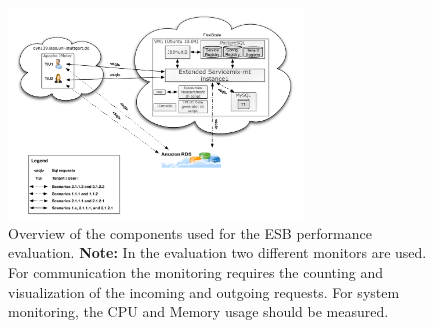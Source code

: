 \begin{figure}[htb]
	\centering
		\includegraphics[width=0.7\textwidth, trim=0.0cm 0.0cm 0.0cm 0.0cm, clip]{./gfx/evaluationoverview.pdf}
	\caption[Performance Evaluation Components Overview]{Overview of the components used for the \ac{ESB} performance evaluation. \textbf{Note:} In the evaluation two different monitors are used. For communication the monitoring requires the counting and visualization of the incoming and outgoing requests. For system monitoring, the CPU and Memory usage should be measured.}
	\label{fig:evaluationoverview}
\end{figure}

\FloatBarrier